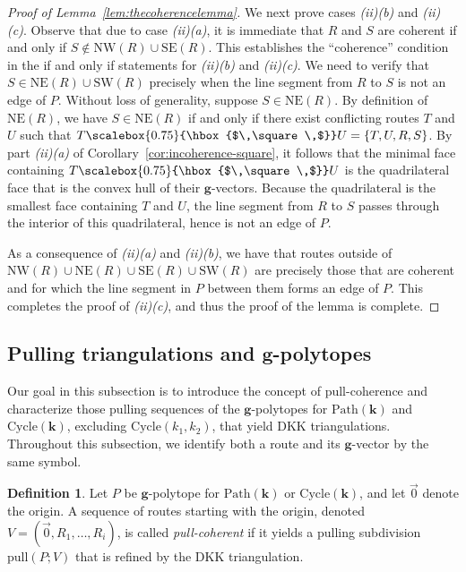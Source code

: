 \documentclass[12pt]{amsart}
\theoremstyle{definition}
\newtheorem{definition}[theorem]{Definition}
\newcommand{\defn}[1]{\emph{\color{blue} #1}}
\newcommand\bg{\mathbf{g}}
\newcommand\bk{\mathbf{k}}
\newcommand\pull{\mathrm{pull}}
\newcommand\Path{\mathrm{Path}}
\newcommand\Cycle{\mathrm{Cycle}}
\newcommand\NW{\mathrm{NW}}
\newcommand\NE{\mathrm{NE}}
\newcommand\SW{\mathrm{SW}}
\newcommand\SE{\mathrm{SE}}
\newcommand\squarette{\scalebox{0.75}{\hbox{$\,\square\,$}}}
\begin{document}
\begin{proof}[Proof of Lemma~\ref{lem:thecoherencelemma}]
We next prove cases \textit{(ii)(b)} and \textit{(ii)(c)}. 
Observe that due to case \textit{(ii)(a)}, it is immediate that $R$ and $S$ are coherent if and only if $S\notin \NW(R)\cup \SE(R)$.
This establishes the ``coherence'' condition in the if and only if statements for \textit{(ii)(b)} and \textit{(ii)(c)}.
We need to verify that $S\in \NE(R)\cup\SW(R)$ precisely when the line segment from $R$ to $S$ is not an edge of $P$.
Without loss of generality, suppose $S\in \NE(R)$.
By definition of $\NE(R)$, we have $S\in \NE(R)$ if and only if there exist conflicting routes $T$ and $U$ such that $T\squarette U=\{T,U,R,S\}$.
By part \textit{(ii)(a)} of Corollary~\ref{cor:incoherence-square}, it follows that the minimal face containing $T\squarette U$ is the quadrilateral face that is the convex hull of their $\bg$-vectors.
Because the quadrilateral is the smallest face containing $T$ and $U$, the line segment from $R$ to $S$ passes through the interior of this quadrilateral, hence is not an edge of $P$.

As a consequence of \textit{(ii)(a)} and \textit{(ii)(b)}, we have that routes outside of $\NW(R)\cup \NE(R)\cup \SE(R)\cup \SW(R)$ are precisely those that are coherent and for which the line segment in $P$ between them forms an edge of $P$.
This completes the proof of \textit{(ii)(c)}, and thus the proof of the lemma is complete.
\end{proof}


\subsection{Pulling triangulations and \texorpdfstring{$\bg$}{g}-polytopes}

Our goal in this subsection is to introduce the concept of pull-coherence and characterize those pulling sequences of the $\bg$-polytopes for $\Path(\bk)$ and $\Cycle(\bk)$, excluding $\Cycle(k_1,k_2)$, that yield DKK triangulations.
Throughout this subsection, we identify both a route and its $\bg$-vector by the same symbol.

\begin{definition}
    \label{def:pullcoherent}
    Let $P$ be $\bg$-polytope for $\Path(\bk)$ or $\Cycle(\bk)$, and let $\vec{0}$ denote the origin.
    A sequence of routes starting with the origin, denoted $V=(\vec{0},R_1,\ldots,R_i)$, is called \defn{pull-coherent} if it yields a pulling subdivision $\pull(P;V)$ that is refined by the DKK triangulation.
\end{definition}
\end{document}
